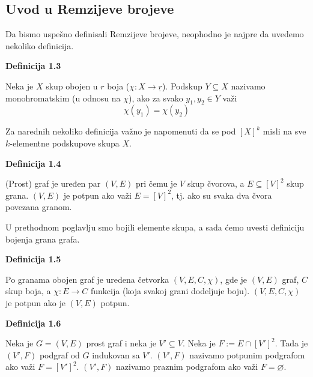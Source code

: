 \documentclass[12pt,a4paper]{article}
\begin{document}
	\newpage
	\subsection{Uvod u Remzijeve brojeve}
	\vspace{1.5em}
	
	Da bismo uspešno definisali Remzijeve brojeve, neophodno je najpre da uvedemo nekoliko definicija.

	\begin{mdframed}
	{\noindent\fontsize{12pt}{12pt}\textbf{Definicija 1.3}}
	\vspace{0.5em}

	\noindent Neka je $X$ skup obojen u $r$ boja ($\chi : X \rightarrow \underline{r}$). Podskup $Y \subseteq X$ nazivamo monohromatskim (u odnosu na $\chi$), ako za svako $y_1, y_2 \in Y$ važi
	\[\chi(y_1) = \chi(y_2)\]
	\end{mdframed}
	\vspace{0.5em}
	
	\noindent Za narednih nekoliko definicija važno je napomenuti da se pod $[X]^{k}$ misli na sve $k$-elementne podskupove skupa $X$.

	\begin{mdframed}
	{\noindent\fontsize{12pt}{12pt}\textbf{Definicija 1.4}}
	\vspace{0.5em}

	\noindent (Prost) graf je uređen par $(V, E)$ pri čemu je $V$ skup čvorova, a $E \subseteq [V]^{2}$ skup grana.
	$(V, E)$ je potpun ako važi $E = [V]^{2}$, tj. ako su svaka dva čvora povezana granom.
	\end{mdframed}
	\vspace{0.5em}
	
	\noindent U prethodnom poglavlju smo bojili elemente skupa, a sada ćemo uvesti definiciju bojenja grana grafa.
	\begin{mdframed}
	{\noindent\fontsize{12pt}{12pt}\textbf{Definicija 1.5}}
	\vspace{0.5em}

	\noindent Po granama obojen graf je uredena četvorka $(V, E, C, \chi)$, gde je $(V, E)$ graf, $C$ skup boja,
	a $\chi : E \rightarrow C$ funkcija (koja svakoj grani dodeljuje boju).
	$(V, E, C, \chi)$ je potpun ako je $(V, E)$ potpun.
	\end{mdframed}
	\vspace{0.5em}
	\begin{mdframed}
	{\noindent\fontsize{12pt}{12pt}\textbf{Definicija 1.6}}
	\vspace{0.5em}

	\noindent Neka je $G = (V, E)$ prost graf i neka je $V' \subseteq V$. Neka je $F := E \cap [V']^{2}$. 
	Tada je $(V' , F)$	podgraf od $G$ indukovan sa $V'$.
	$(V', F)$ nazivamo potpunim podgrafom ako važi $F = [V']^{2}$.
	$(V', F)$ nazivamo praznim podgrafom ako važi $F = \varnothing$.
	\end{mdframed}
	\vspace{0.5em}
\end{document}
